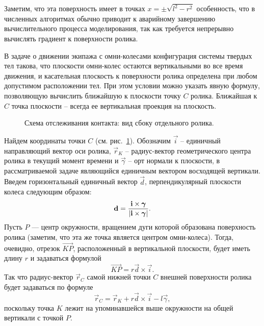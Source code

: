 Заметим, что эта поверхность имеет  в 
точках $x=\pm \sqrt{l^2 - r^2}$ особенность, что в численных алгоритмах обычно приводит к аварийному завершению вычислительного процесса моделирования, так как требуется непрерывно вычислять градиент к поверхности ролика.

В задаче о движении экипажа с омни-колесами конфигурация системы твердых тел такова, что плоскости омни-колес остаются вертикальными во все время движения, и касательная плоскость к поверхности ролика определена при любом допустимом расположении тел. При этом условии можно указать явную формулу, позволяющую вычислить ближайшую к плоскости точку $C$ ролика. Ближайшая к $C$ точка плоскости -- всегда ее вертикальная проекция на плоскость.

\begin{figure}[htb]
    \centering
    \caption{Схема отслеживания контакта: вид сбоку отдельного ролика.}
    \label{ContactScheme}
\end{figure}

Найдем координаты точки $C$ (см. рис.~\ref{ContactScheme}). Обозначим $\vec{i}$ -- единичный направляющий вектор оси ролика, $\vec{r}_K$ -- радиус-вектор геометрического центра ролика в текущий момент времени и $\vec{\gamma}$ -- орт нормали к плоскости, в рассматриваемой задаче являющийся единичным вектором восходящей вертикали. Введем горизонтальный единичный вектор $\vec{d}$, перпендикулярный плоскости колеса следующим образом:
$$
    \boldsymbol{\mathbf{d}} = \displaystyle\frac{\displaystyle \boldsymbol{\mathbf{i}} \times \boldsymbol{\mathbf{\gamma}}}{\displaystyle \left| \boldsymbol{\mathbf{i}} \times \boldsymbol{\mathbf{\gamma}} \right|}.
$$
Пусть $P$ --- центр окружности, вращением дуги которой образована поверхность ролика (заметим, что эта же точка является центром омни-колеса). Тогда, очевидно, отрезок $\overrightarrow{KP}$, расположенный в вертикальной
плоскости, будет иметь длину $r$ и задаваться формулой
$$
    \overrightarrow{KP} = r\vec{d} \times \vec{i}.
$$
Так что радиус-вектор $\vec{r}_C$ самой нижней точки $C$ внешней поверхности ролика будет задаваться по формуле
\begin{equation}
    \vec{r}_C = \vec{r}_K + r\vec{d} \times \vec{i} - l\vec{\gamma},
\label{3_2_0}
\end{equation}
поскольку точка $K$ лежит на упоминавшейся выше окружности на общей вертикали с точкой $P$.


